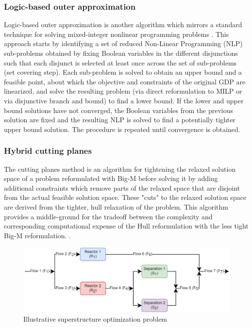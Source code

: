 \documentclass{juliacon}
\begin{document}
\subsubsection{Logic-based outer approximation}
Logic-based outer approximation is another algorithm which mirrors a standard technique for solving mixed-integer nonlinear programming problems \cite{E.Grossmann2009}. This approach starts by identifying a set of reduced Non-Linear Programming (NLP) sub-problems obtained by fixing Boolean variables in the different disjunctions such that each disjunct is selected at least once across the set of sub-problems (set covering step).
Each sub-problem is solved to obtain an upper bound and a feasible point, about which the objective and constraints of the original GDP are linearized, and solve the resulting problem (via direct reformulation to MILP or via disjunctive branch and bound) to find a lower bound. If the lower and upper bound solutions have not converged, the Boolean variables from the previous solution are fixed and the resulting NLP is solved to find a potentially tighter upper bound solution. The procedure is repeated until convergence is obtained.

\subsubsection{Hybrid cutting planes}
The cutting planes method is an algorithm for tightening the relaxed solution space of a problem reformulated with Big-M before solving it by adding additional constraints which remove parts of the relaxed space that are disjoint from the actual feasible solution space. These "cuts" to the relaxed solution space are derived from the tighter, hull relaxation of the problem. This algorithm provides a middle-ground for the tradeoff between the complexity and corresponding computational expense of the Hull reformulation with the less tight Big-M reformulation. \cite{trespalacios_grossmann_2016}.

\begin{figure}
    \centering
    \includegraphics[scale=0.6]{superstructure_pfd.png}
    \caption{Illustrative superstructure optimization problem}
    \label{fig:superstruct_opt_diagram}
\end{figure}
\end{document}
